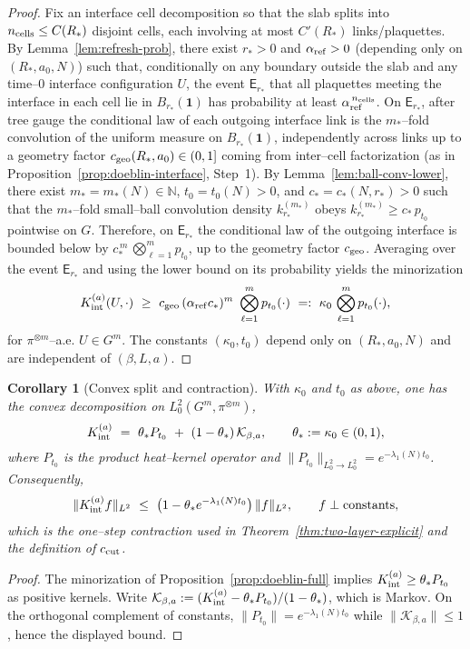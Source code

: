 \documentclass[11pt]{amsart}
\theoremstyle{plain}
\newtheorem{corollary}[theorem]{Corollary}
\theoremstyle{definition}
\theoremstyle{remark}
\begin{document}
\begin{proof}
Fix an interface cell decomposition so that the slab splits into $n_{\rm cells}\le C(R_*)$ disjoint cells, each involving at most $C'(R_*)$ links/plaquettes. By Lemma~\ref{lem:refresh-prob}, there exist $r_*>0$ and $\alpha_{\rm ref}>0$ (depending only on $(R_*,a_0,N)$) such that, conditionally on any boundary outside the slab and any time–$0$ interface configuration $U$, the event $\mathsf E_{r_*}$ that all plaquettes meeting the interface in each cell lie in $B_{r_*}(\mathbf 1)$ has probability at least $\alpha_{\rm ref}^{\,n_{\rm cells}}$. On $\mathsf E_{r_*}$, after tree gauge the conditional law of each outgoing interface link is the $m_*$–fold convolution of the uniform measure on $B_{r_*}(\mathbf 1)$, independently across links up to a geometry factor $c_{\rm geo}(R_*,a_0)\in(0,1]$ coming from inter–cell factorization (as in Proposition~\ref{prop:doeblin-interface}, Step~1). By Lemma~\ref{lem:ball-conv-lower}, there exist $m_*=m_*(N)\in\mathbb N$, $t_0=t_0(N)>0$, and $c_*=c_*(N,r_*)>0$ such that the $m_*$–fold small–ball convolution density $k_{r_*}^{(m_*)}$ obeys $k_{r_*}^{(m_*)}\ge c_*\,p_{t_0}$ pointwise on $G$. Therefore, on $\mathsf E_{r_*}$ the conditional law of the outgoing interface is bounded below by $c_*^{\,m}\,\bigotimes_{\ell=1}^m p_{t_0}$, up to the geometry factor $c_{\rm geo}$. Averaging over the event $\mathsf E_{r_*}$ and using the lower bound on its probability yields the minorization
\[
  K_{\rm int}^{(a)}(U,\cdot)\ \ge\ c_{\rm geo}\, (\alpha_{\rm ref} c_*)^{m}\ \bigotimes_{\ell=1}^m p_{t_0}(\cdot)\ =:\ \kappa_0\, \bigotimes_{\ell=1}^m p_{t_0}(\cdot),
\]
for $\pi^{\otimes m}$–a.e. $U\in G^m$. The constants $(\kappa_0,t_0)$ depend only on $(R_*,a_0,N)$ and are independent of $(\beta,L,a)$.
\end{proof}

\begin{corollary}[Convex split and contraction]\label{cor:convex-split}
With $\kappa_0$ and $t_0$ as above, one has the convex decomposition on $L^2_0(G^m,\pi^{\otimes m})$,
\[
  K_{\rm int}^{(a)}\ =\ \theta_* P_{t_0}\ +\ (1-\theta_*)\,\mathcal{K}_{\beta,a},\qquad \theta_*:=\kappa_0\in(0,1),
\]
where $P_{t_0}$ is the product heat–kernel operator and $\|P_{t_0}\|_{L^2_0\to L^2_0}=e^{-\lambda_1(N) t_0}$. Consequently,
\[
  \|K_{\rm int}^{(a)} f\|_{L^2}\ \le\ \big(1-\theta_* e^{-\lambda_1(N) t_0}\big)\,\|f\|_{L^2},\qquad f\perp \text{constants},
\]
which is the one–step contraction used in Theorem~\ref{thm:two-layer-explicit} and the definition of $c_{\rm cut}$.
\end{corollary}
\begin{proof}
The minorization of Proposition~\ref{prop:doeblin-full} implies $K_{\rm int}^{(a)}\ge \theta_* P_{t_0}$ as positive kernels. Write $\mathcal{K}_{\beta,a}:=(K_{\rm int}^{(a)}-\theta_* P_{t_0})/(1-\theta_*)$, which is Markov. On the orthogonal complement of constants, $\|P_{t_0}\|=e^{-\lambda_1(N) t_0}$ while $\|\mathcal{K}_{\beta,a}\|\le 1$, hence the displayed bound.
\end{proof}
\end{document}
